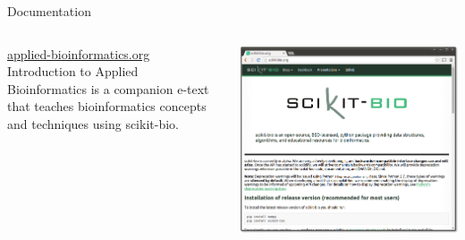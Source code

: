 \documentclass[final,t]{beamer}
\begin{document}
\begin{frame}{}
\begin{columns}[t]
\begin{column}{.3\linewidth}
\begin{block}{Documentation}
\begin{columns}
\begin{column}{.45\linewidth}
\begin{minipage}[c][15cm][c]{\linewidth}
                    \end{minipage}
                    \begin{minipage}[c][15cm][c]{\linewidth}
                        \href{http://applied-bioinformatics.org}{\color{blue}\underline{applied-bioinformatics.org}}
                        \newline\newline
                        Introduction to Applied Bioinformatics is a companion e-text that teaches bioinformatics concepts and techniques using scikit-bio.
                    \end{minipage}
                \end{column}
                \begin{column}{.45\linewidth}
                    \begin{minipage}[c][15cm][c]{\linewidth}
                        \includegraphics[width=1\linewidth]{assets/website}\\
                    \end{minipage}
                    \begin{minipage}[c][15cm][c]{\linewidth}

\end{minipage}
\end{column}
\end{columns}
\end{block}
\end{column}
\end{columns}
\end{frame}
\end{document}
